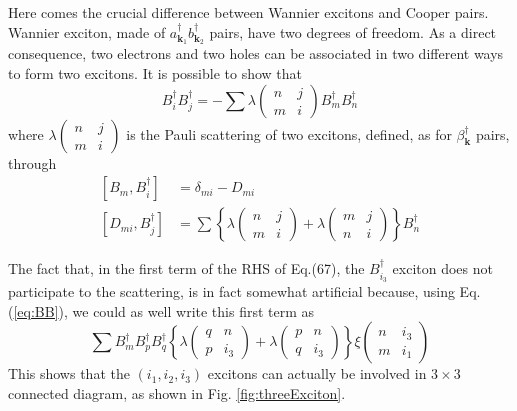 \documentclass[aps,prb,superscriptaddress,showpacs,reprint,lengthcheck]{revtex4}
\newcommand{\vk}{\ensuremath{\mathbf{k}}}
\begin{document}
Here comes the crucial difference between Wannier excitons and Cooper pairs. Wannier exciton, made of $a^\dagger_{\vk_1}b^\dagger_{\vk_2}$ pairs, have two degrees of freedom. As a direct consequence,  two electrons and two holes can be associated in two different ways to form two excitons. It is possible to show \cite{CobosonPhysicsReports} that
\begin{equation}\label{eq:BB}
B^\dagger_iB^\dagger_j=-\sum\lambda\left(\begin{smallmatrix}n&j\\m&i\end{smallmatrix}%
\right)  B^{\dagger}_{m}B^{\dagger}_{n}
\end{equation}
where $\lambda\left(\begin{smallmatrix}n&j\\m&i\end{smallmatrix}\right)$  is the Pauli scattering of two excitons, defined, as for $\beta^\dagger_\vk$ pairs, through
\begin{equation}
\begin{split}
\left[B_m,B^{\dagger}_{i}\right]&=\delta_{mi}-D_{mi}\\
\left[D_{mi},B^{\dagger}_{j}\right]&=\sum\left\{\lambda\left(\begin{smallmatrix}n&j\\m&i\end{smallmatrix}\right)
+\lambda\left(\begin{smallmatrix}m&j\\n&i\end{smallmatrix}\right)\right\} B^{\dagger}_{n}
\end{split}
\end{equation}

The fact that, in the first term of the RHS of Eq.(67), the $B^\dagger_{i_3}$ exciton does not participate to the scattering, is in fact somewhat artificial because, using Eq.(\ref{eq:BB}), we could as well write this first term as
\begin{equation}\label{eq:3BLambdaXi}
\sum{}B^\dagger_mB^\dagger_pB^\dagger_q\left\{\lambda\left(\begin{smallmatrix}q&n\\p&i_3\end{smallmatrix}\right)
+\lambda\left(\begin{smallmatrix}p&n\\q&i_3\end{smallmatrix}\right)\right\} \xi\left(\begin{smallmatrix}n&i_3\\m&i_1\end{smallmatrix}\right)
\end{equation}
This shows that the $(i_1,i_2,i_3)$ excitons can actually be involved in $3\times3$ connected diagram, as shown in Fig. \ref{fig:threeExciton}.
\end{document}
